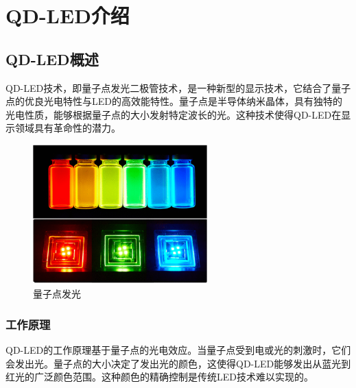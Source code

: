 \documentclass[12pt,hyperref,a4paper,UTF8]{ctexart}
\begin{document}
\newpage

\section{QD-LED介绍}

\subsection{QD-LED概述}
QD-LED技术，即量子点发光二极管技术，是一种新型的显示技术，它结合了量子点的优良光电特性与LED的高效能特性。量子点是半导体纳米晶体，具有独特的光电性质，能够根据量子点的大小发射特定波长的光。这种技术使得QD-LED在显示领域具有革命性的潜力。
\begin{figure}[H]
    \centering
    \includegraphics[width=0.6\textwidth]{figures/fig/image1.png}
    \caption{量子点发光\cite{jang2023quantum}}
\end{figure}
\subsubsection*{工作原理}
QD-LED的工作原理基于量子点的光电效应。当量子点受到电或光的刺激时，它们会发出光。量子点的大小决定了发出光的颜色，这使得QD-LED能够发出从蓝光到红光的广泛颜色范围。这种颜色的精确控制是传统LED技术难以实现的。
\end{document}
